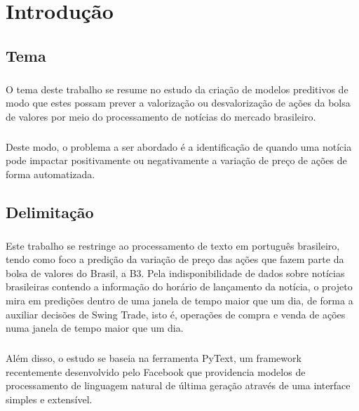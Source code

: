 \documentclass[grad,numbers]{coppe}
\begin{document}
  \tableofcontents
  \listoffigures
  \listoftables
  \printlosymbols
  \printloabbreviations

  \mainmatter
	\chapter{Introdução}
		
		\section{Tema}
			\paragraph{}O tema deste trabalho se resume no estudo da criação de modelos preditivos de modo que estes possam prever a valorização ou desvalorização de ações da bolsa de valores por meio do processamento de notícias do mercado brasileiro.
			\paragraph{}Deste modo, o problema a ser abordado é a identificação de quando uma notícia pode impactar positivamente ou negativamente a variação de preço de ações de forma automatizada.
			
		\section{Delimitação}
			\paragraph{}Este trabalho se restringe ao processamento de texto em português brasileiro, tendo como foco a predição da variação de preço das ações que fazem parte da bolsa de valores do Brasil, a B3. Pela indisponibilidade de dados sobre notícias brasileiras contendo a informação do horário de lançamento da notícia, o projeto mira em predições dentro de uma janela de tempo maior que um dia, de forma a auxiliar decisões de Swing Trade, isto é, operações de compra e venda de ações numa janela de tempo maior que um dia.
			\paragraph{}Além disso, o estudo se baseia na ferramenta PyText, um framework recentemente desenvolvido pelo Facebook que providencia modelos de processamento de linguagem natural de última geração através de uma interface simples e extensível\cite{pytext-paper}.
		
\end{document}
